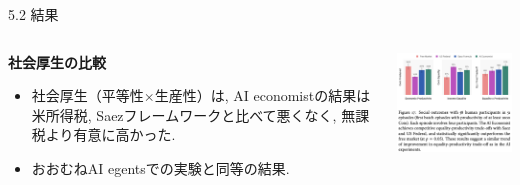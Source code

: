 \documentclass[unicode,aspectratio=169,11pt]{beamer}
\begin{document}
\begin{frame}{5.2 結果}{}
    \begin{columns}
        \begin{column}{0.5\textwidth}
            {\bf 社会厚生の比較}
            \begin{itemize}
                \item 社会厚生（平等性$\times$生産性）は, AI economistの結果は米所得税, Saezフレームワークと比べて悪くなく, 無課税より有意に高かった.
                \item おおむねAI egentsでの実験と同等の結果.
            \end{itemize}
        \end{column}
        \begin{column}{0.5\textwidth}
            \begin{center}
                \includegraphics[width=7cm]{figure17.png}
            \end{center}
        \end{column}
    \end{columns}
\end{frame}

\end{document}
